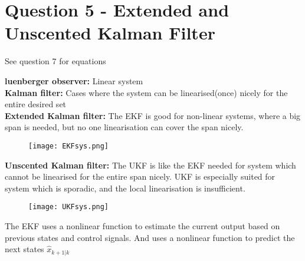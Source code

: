 \chapter{Question 5 - Extended and Unscented Kalman Filter}

See question 7 for equations

\textbf{luenberger observer:} Linear system \\
\textbf{Kalman filter:} Cases where the system can be linearised(once) nicely for the entire desired set \\
\textbf{Extended Kalman filter:} The EKF is good for non-linear systems, where a big span is needed, but no one linearisation can cover the span nicely. \\
\begin{figure}[H]
        \texttt{[image: EKFsys.png]}
\end{figure}
\textbf{Unscented Kalman filter:} The UKF is like the EKF needed for system which cannot be linearised for the entire span nicely. UKF is especially suited for system which is sporadic, and the local linearisation is insufficient.
\begin{figure}[H]
        \texttt{[image: UKFsys.png]}
\end{figure}

The EKF uses a nonlinear function to estimate the current output based on previous states and control signals. And uses a nonlinear function to predict the next states $\hat{x}_{k+1 \vert k}$
